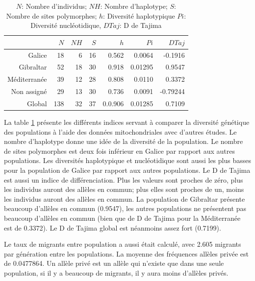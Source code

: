 \documentclass[a4paper,12pt,twoside]{article}\usepackage[]{graphicx}\usepackage[]{color}
\begin{document}
\begin {bibunit} [newbst]
\begin{table}[!]
\centering
\caption[Table des indices génétiques pour les ADN mitochondriaux \label{mito}]{$N$: Nombre d'individus; $NH$: Nombre d'haplotype; $S$: Nombre de sites polymorphes; $h$: Diversité haplotypique $Pi$: Diversité nucléotidique, $D Taj$: D de Tajima}
\label{mito}
\begin{tabular}{rrrrrrr}
\toprule
 & $N$	&	$NH$	&	$S$	&	$h$	&	$Pi$	& $D Taj$\\
\hline
Galice &	18	&	6	&	16	&	0.562	&	0.0064 & -0.1916	\\
Gibraltar &	52	&	18	&	30	&	0.918	&	0.01295 & 0.9547	\\
Méditerranée &	39	&	12	&	28	&	0.808	&	0.0110	& 0.3372 \\
Non assigné	&	29	&	13	&	30	&	0.736	&	0.0091	& -0.79244	\\
\midrule
Global &	138	&	32	&	37	&	0.0.906	&	0.01285 & 0.7109	\\
\bottomrule
\end{tabular}
\end{table}

La table \ref{mito} présente les différents indices servant à comparer la diversité génétique des populations à l'aide des données mitochondriales avec d'autres études. Le nombre d'haplotype donne une idée de la diversité de la population. Le nombre de sites polymorphes est deux fois inférieur en Galice par rapport aux autres populations. Les diversités haplotypique et nucléotidique sont aussi les plus basses pour la population de Galice par rapport aux autres populations. Le D de Tajima est aussi un indice de différenciation. Plus les valeurs sont proches de zéro, plus les individus auront des allèles en commun; plus elles sont proches de un, moins les individus auront des allèles en commun. La population de Gibraltar présente beaucoup d'allèles en commun (0.9547), les autres populations ne présentent pas beaucoup d'allèles en commun (bien que de D de Tajima pour la Méditerranée est de 0.3372). Le D de Tajima global est néanmoins assez fort (0.7199).

Le taux de migrants entre population a aussi était calculé, avec 2.605 migrants par génération entre les populations. La moyenne des fréquences allèles privée est de 0.0477864. Un allèle privé est un allèle qui n'existe que dans une seule population, si il y a beaucoup de migrants, il y aura moins d'allèles privés.


\end{bibunit}
\end{document}
